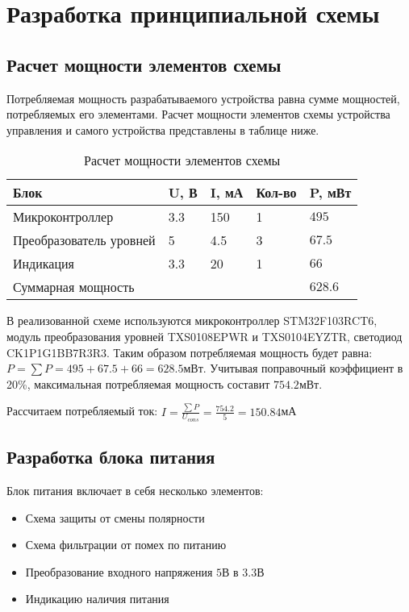 \section{Разработка принципиальной схемы}
\label{sec:principal}

\subsection{Расчет мощности элементов схемы}
Потребляемая мощность разрабатываемого устройства равна сумме мощностей, потребляемых его элементами. Расчет мощности элементов схемы устройства управления и самого устройства представлены в таблице ниже.

\begin{table}[ht]
    \caption{Расчет мощности элементов схемы}
    \label{table:power_calc}
    \begin{tabular}{|llll|l|}
        \hline
        \multicolumn{1}{|l|}{Блок}                    & \multicolumn{1}{l|}{U, В} & \multicolumn{1}{l|}{I, мА} & Кол-во & P, мВт  \\ \hline
        \multicolumn{1}{|l|}{Микроконтроллер}         & \multicolumn{1}{l|}{3.3}  & \multicolumn{1}{l|}{150}   & 1      & $495$   \\ \hline
        \multicolumn{1}{|l|}{Преобразователь уровней} & \multicolumn{1}{l|}{5}    & \multicolumn{1}{l|}{4.5}   & 3      & $67.5$  \\ \hline
        \multicolumn{1}{|l|}{Индикация}               & \multicolumn{1}{l|}{3.3}  & \multicolumn{1}{l|}{20}    & 1      & $66$    \\ \hline
        \multicolumn{4}{|l|}{Суммарная мощность}                                                                        & $628.6$ \\ \hline
    \end{tabular}
\end{table}

В реализованной схеме используются микроконтроллер STM32F103RCT6, модуль преобразования уровней TXS0108EPWR и TXS0104EYZTR, светодиод CK1P1G1BB7R3R3. Таким образом потребляемая мощность будет равна: \(P = \sum P = 495 + 67.5 + 66 = 628.5\)мВт. Учитывая поправочный коэффициент в 20\%, максимальная потребляемая мощность составит \(754.2 мВт\).

Рассчитаем потребляемый ток:
\(I=\frac{\sum P}{U_{cons}}=\frac{754.2}{5}=150.84\)мА

\subsection{Разработка блока питания}
Блок питания включает в себя несколько элементов:
\begin{itemize}
    \item Схема защиты от смены полярности
    \item Схема фильтрации от помех по питанию
    \item Преобразование входного напряжения $5В$ в $3.3В$
    \item Индикацию наличия питания
\end{itemize}

